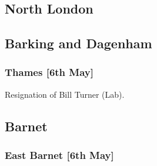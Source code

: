 \documentclass[a4paper,openany]{book}
\begin{document}
\begin{resultsiii}

%
%
%
%
%

\section{North London}

\subsection*{Barking and Dagenham}

\subsubsection*{Thames \hspace*{\fill}\nolinebreak[1]%
	\enspace\hspace*{\fill}
	[6th May]}


Resignation of Bill Turner (Lab).

\subsection*{Barnet}

\subsubsection*{East Barnet \hspace*{\fill}\nolinebreak[1]%
	\enspace\hspace*{\fill}
	[6th May]}


\end{resultsiii}
\end{document}
